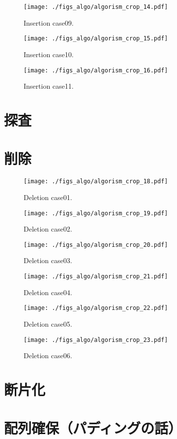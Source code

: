 \begin{figure}[h]
  \texttt{[image: ./figs\_algo/algorism\_crop\_14.pdf]}
  \caption{ Insertion case09. }
  \label{fig_IpCHashT_insert_hard_case09}
\end{figure}

\begin{figure}[h]
  \texttt{[image: ./figs\_algo/algorism\_crop\_15.pdf]}
  \caption{ Insertion case10. }
  \label{fig_IpCHashT_insert_hard_case10}
\end{figure}

\begin{figure}[h]
  \texttt{[image: ./figs\_algo/algorism\_crop\_16.pdf]}
  \caption{ Insertion case11. }
  \label{fig_IpCHashT_insert_hard_case11}
\end{figure}





\section{探査}


\section{削除}
\begin{figure}[h]
  \texttt{[image: ./figs\_algo/algorism\_crop\_18.pdf]}
  \caption{ Deletion case01. }
  \label{fig_IpCHashT_deletion_case01}
\end{figure}

\begin{figure}[h]
  \texttt{[image: ./figs\_algo/algorism\_crop\_19.pdf]}
  \caption{ Deletion case02. }
  \label{fig_IpCHashT_deletion_case02}
\end{figure}

\begin{figure}[h]
  \texttt{[image: ./figs\_algo/algorism\_crop\_20.pdf]}
  \caption{ Deletion case03. }
  \label{fig_IpCHashT_deletion_case03}
\end{figure}

\begin{figure}[h]
  \texttt{[image: ./figs\_algo/algorism\_crop\_21.pdf]}
  \caption{ Deletion case04. }
  \label{fig_IpCHashT_deletion_case04}
\end{figure}

\begin{figure}[h]
  \texttt{[image: ./figs\_algo/algorism\_crop\_22.pdf]}
  \caption{ Deletion case05. }
  \label{fig_IpCHashT_deletion_case05}
\end{figure}

\begin{figure}[h]
  \texttt{[image: ./figs\_algo/algorism\_crop\_23.pdf]}
  \caption{ Deletion case06. }
  \label{fig_IpCHashT_deletion_case06}
\end{figure}

\section{断片化}

\section{配列確保（パディングの話）}









